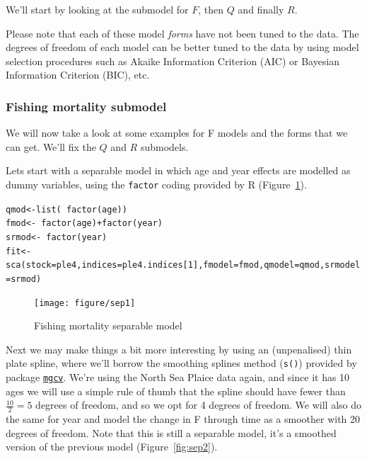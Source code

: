 \documentclass[a4paper,english,10pt]{article}\usepackage[]{graphicx}\usepackage[]{color}
\makeatletter
\newcommand{\hlnum}[1]{\textcolor[rgb]{0.2,0.2,0.2}{#1}}%
\newcommand{\hlopt}[1]{\textcolor[rgb]{0.2,0.2,0.2}{#1}}%
\newcommand{\hlstd}[1]{\textcolor[rgb]{0,0,0}{#1}}%
\newcommand{\hlkwb}[1]{\textcolor[rgb]{0.361,0.506,0.596}{#1}}%
\newcommand{\hlkwc}[1]{\textcolor[rgb]{0.361,0.506,0.596}{#1}}%
\newcommand{\hlkwd}[1]{\textcolor[rgb]{0.361,0.506,0.596}{#1}}%
\newenvironment{kframe}{%
 \def\at@end@of@kframe{}%
 \ifinner\ifhmode%
  \def\at@end@of@kframe{\end{minipage}}%
  \begin{minipage}{\columnwidth}%
 \fi\fi%
 \def\FrameCommand##1{\hskip\@totalleftmargin \hskip-\fboxsep
 \colorbox{shadecolor}{##1}\hskip-\fboxsep
     \hskip-\linewidth \hskip-\@totalleftmargin \hskip\columnwidth}%
 \MakeFramed {\advance\hsize-\width
   \@totalleftmargin\z@ \linewidth\hsize
   \@setminipage}}%
 {\par\unskip\endMakeFramed%
 \at@end@of@kframe}
\newenvironment{knitrout}{}{} %
\newcommand{\code}[1]{{\texttt{#1}}}
\newcommand{\pkg}[1]{{\texttt{#1}}}
\makeatother
\begin{document}
We'll start by looking at the submodel for $F$, then $Q$ and finally $R$.

Please note that each of these model \emph{forms} have not been tuned to the data. The degrees of freedom of each model can be better tuned to the data by using model selection procedures such as Akaike Information Criterion (AIC) or Bayesian Information Criterion (BIC), etc.

\subsubsection{Fishing mortality submodel}

We will now take a look at some examples for F models and the forms that we can get. We'll fix the $Q$ and $R$ submodels. 

Lets start with a separable model in which age and year effects are modelled as dummy variables, using the \code{factor} coding provided by R (Figure~\ref{fig:sep1}). 

\begin{knitrout}
\color{fgcolor}\begin{kframe}
\begin{alltt}
\hlstd{qmod} \hlkwb{<-} \hlkwd{list}\hlstd{(}\hlopt{~} \hlkwd{factor}\hlstd{(age))}
\hlstd{fmod} \hlkwb{<-} \hlopt{~} \hlkwd{factor}\hlstd{(age)} \hlopt{+} \hlkwd{factor}\hlstd{(year)}
\hlstd{srmod} \hlkwb{<-} \hlopt{~} \hlkwd{factor}\hlstd{(year)}
\hlstd{fit} \hlkwb{<-} \hlkwd{sca}\hlstd{(}\hlkwc{stock} \hlstd{= ple4,} \hlkwc{indices} \hlstd{= ple4.indices[}\hlnum{1}\hlstd{],} \hlkwc{fmodel}\hlstd{=fmod,} \hlkwc{qmodel}\hlstd{=qmod,} \hlkwc{srmodel}\hlstd{=srmod)}
\end{alltt}
\end{kframe}
\end{knitrout}

\begin{knitrout}
\color{fgcolor}\begin{figure}[H]


{\centering \texttt{[image: figure/sep1]} 

}

\caption[Fishing mortality separable model]{Fishing mortality separable model\label{fig:sep1}}
\end{figure}


\end{knitrout}

Next we may make things a bit more interesting by using an (unpenalised) thin plate spline, where we'll borrow the smoothing splines method (\code{s()}) provided by package \href{http://cran.r-project.org/web/packages/mgcv/}{\pkg{mgcv}}. We're using the North Sea Plaice data again, and since it has 10 ages we will use a simple rule of thumb that the spline should have fewer than $\frac{10}{2} = 5$ degrees of freedom, and so we opt for 4 degrees of freedom. We will also do the same for year and model the change in F through time as a smoother with 20 degrees of freedom. Note that this is still a separable model, it's a smoothed version of the previous model (Figure~\ref{fig:sep2}).
\end{document}

